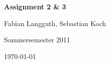 



\begin{center}
    \huge {\bf Assignment 2 \& 3}
    
    \small Fabian Langguth, Sebastian Koch
    
    Sommersemester 2011
    
    \today
\end{center}





